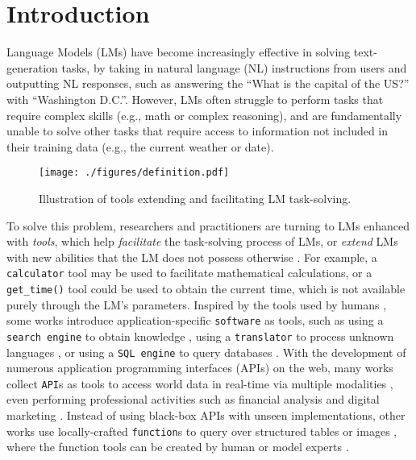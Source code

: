 \section{Introduction}
\label{sec:intro}

Language Models (LMs) have become increasingly effective in solving text-generation tasks, by taking in natural language (NL) instructions from users and outputting NL responses, such as answering the ``What is the capital of the US?'' with ``Washington D.C.''. However, LMs often struggle to perform tasks that require complex skills (e.g., math or complex reasoning), and are fundamentally unable to solve other tasks that require access to information not included in their training data (e.g., the current weather or date).

\begin{wrapfigure}[13]{r}{0.42\textwidth}
\vspace{-4mm}    
\texttt{[image: ./figures/definition.pdf]}
\vspace{-2mm}
\caption{Illustration of tools extending and facilitating LM task-solving.}
\label{fig:def}
\end{wrapfigure}

To solve this problem, researchers and practitioners are turning to LMs enhanced with \emph{tools}, which help \textit{facilitate} the task-solving process of LMs, or \textit{extend} LMs with new abilities that the LM does not possess otherwise \citep{qin2023tool,mialon2023augmented}.
For example, a \texttt{calculator} tool may be used to facilitate mathematical calculations, or a \texttt{get\_time()} tool could be used to obtain the current time, which is not available purely through the LM's parameters. 
Inspired by the tools used by humans \citep{shumaker2011animal}, some works introduce application-specific \texttt{software} as tools, such as using a \texttt{search engine} to obtain knowledge \citep{lazaridou2022internetaugmented,komeili-etal-2022-internet}, using a \texttt{translator} to process unknown languages \citep{schick2023toolformer}, or using a \texttt{SQL engine} to query databases \citep{hao2023toolkengpt,zhuang2023toolqa}.
With the development of numerous application programming interfaces (APIs) on the web, many works collect \texttt{API}s as tools to access world data in real-time \citep{balog2016deepcoder,xu2023tool,qin2023toolllm} via multiple modalities \citep{tang2023toolalpaca}, even performing professional activities such as financial analysis \citep{li-etal-2023-api} and digital marketing \citep{huang2024metatool}.
Instead of using black-box APIs with unseen implementations, other works use locally-crafted \texttt{function}s to query over structured tables \citep{wang2024executable,cao2023api} or images \citep{suris2023vipergpt}, where the function tools can be created by human \citep{gupta2022visual} or model experts \citep{wang2023voyager,cai2023large,wang2024trove}.

